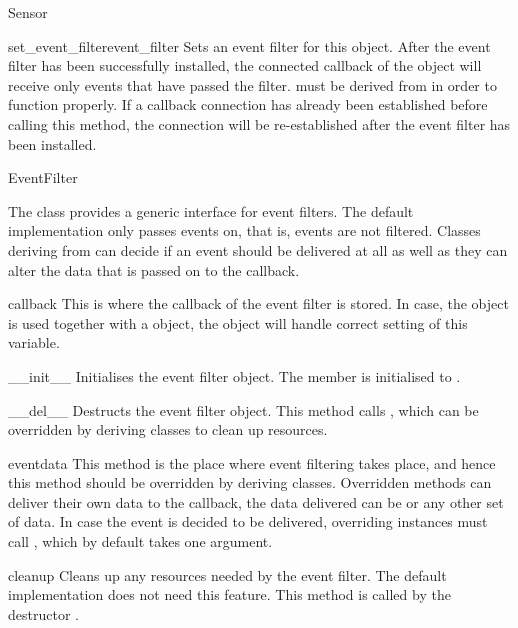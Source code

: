 \begin{classdesc*}{Sensor}
\begin{methoddesc}[Sensor]{set_event_filter}{event_filter}
Sets an event filter for this  object. After the event filter has been
successfully installed, the connected callback of the  object will
receive only events that have passed the filter.  must be derived
from  in order to function properly.
If a callback connection has already been established before calling this method,
the connection will be re-established after the event filter has been installed.
\end{methoddesc}
\end{classdesc*}

\begin{classdesc*}{EventFilter}

The  class provides a generic interface for event filters.
The default implementation only passes events on, that is, events are not filtered.
Classes deriving from  can decide if an event should be
delivered at all as well as they can alter the data that is passed on to
the callback.

\begin{memberdesc}[EventFilter]{callback}
This is where the callback of the event filter is stored. In case, the 
object is used together with a  object, the  object will
handle correct setting of this variable.
\end{memberdesc}

\begin{methoddesc}[EventFilter]{__init__}{}
Initialises the event filter object. The  member is initialised to
.
\end{methoddesc}

\begin{methoddesc}[EventFilter]{__del__}{}
Destructs the event filter object. This method calls ,
which can be overridden by deriving classes to clean up resources.
\end{methoddesc}

\begin{methoddesc}[EventFilter]{event}{data}
This method is the place where event filtering takes place, and hence
this method should be overridden by deriving classes. Overridden 
methods can deliver their own data to the callback, the data delivered can be
 or any other set of data.
In case the event is decided to be delivered, overriding instances must
call , which by default takes one argument.
\end{methoddesc}

\begin{methoddesc}[EventFilter]{cleanup}{}
Cleans up any resources needed by the event filter. The default implementation
does not need this feature.
This method is called by the destructor .
\end{methoddesc}
\end{classdesc*}

